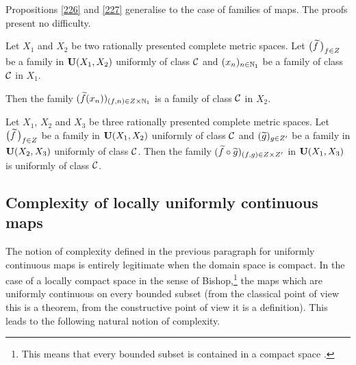 Propositions \ref{226} and \ref{227} generalise to the case of families of maps. The proofs present no difficulty.

\begin{proposition} \label{2211}
Let $X_1$ and $X_2$ be two rationally presented complete metric spaces. Let $\big(\widetilde{f}\,\big)_{f \in Z}$ be a family in ${\bf U}(X_1,X_2)$ uniformly of class ${{\cal C}}$ and $(x_n)_{n \in \mathbb {N}_1}$ be a family of class ${{\cal C}}$ in $X_1$.

\noindent 
Then the family $(\widetilde{f}(x_n))_{(f,n) \in Z \times \mathbb {N}_1}$ is a family of class ${{\cal C}}$ in $X_2$.
\end{proposition}

\begin{proposition} \label{2212}
Let $X_1$, $X_2$ and $X_3$ be three rationally presented complete metric spaces. Let $\big(\widetilde{f}\,\big)_{f \in Z}$ be a family in ${\bf U}(X_1,X_2)$ uniformly of class ${{\cal C}}$ and $(\widetilde{g})_{g \in Z'}$ be a family in ${\bf U}(X_2,X_3)$ uniformly of class ${{\cal C}}$.  
Then the family $(\widetilde{f} \circ \widetilde{g})_{(f,g) \in Z \times Z'}$ in ${\bf U}(X_1,X_3)$ is uniformly of class ${{\cal C}}$.
\end{proposition}

\subsection{Complexity of locally uniformly continuous maps} \label{subsec23}

The notion of complexity defined in the previous paragraph for uniformly continuous maps is entirely legitimate when the domain space is compact. 
In the case of a locally compact space in the sense of Bishop,\footnote{This means that every bounded subset is contained in a compact space \cite{BB}.} the  maps which are uniformly continuous on every bounded subset (from the classical point of view this is a theorem, from the constructive point of view it is a definition). This leads to the  following natural notion of complexity.

